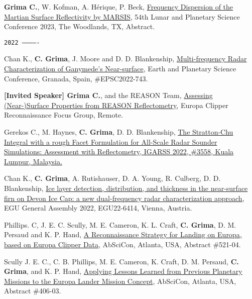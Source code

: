 \begin{etaremune}
\item
    \textbf{Grima C.}, W. Kofman, A. Hérique, P. Beck, \href{https://www.hou.usra.edu/meetings/lpsc2023/pdf/1120.pdf}{Frequency Dispersion of the Martian Surface Reflectivity by MARSIS}, 54th Lunar and Planetary Science Conference 2023, The Woodlands, TX, Abstract.

\hspace{-2em}\texttt{2022 -------------}

\item
  Chan K., \textbf{C. Grima}, J. Moore and D. D. Blankenship, \href{https://meetingorganizer.copernicus.org/EPSC2022/EPSC2022-743.html?pdf}{Multi-frequency Radar Characterization of Ganymede's Near-surface}, Earth and Planetary Science Conference, Granada, Spain, \#EPSC2022-743. 
\item
  \textbf{[Invited Speaker] Grima C.}, and the REASON Team, \href{}{Assessing (Near-)Surface Properties from REASON Reflectometry}, Europa Clipper Reconnaissance Focus Group, Remote.
\item
  Gerekos C., M. Haynes, \textbf{C. Grima}, D. D. Blankenship, \href{https://www.igarss2022.org/view_paper.php?PaperNum=3558}{The Stratton-Chu Integral with a rough Facet Formulation for All-Scale Radar Sounder Simulations: Assessment with Reflectometry, IGARSS 2022, \#3558, Kuala Lumpur, Malaysia.}
\item
  Chan K., \textbf{C. Grima}, A. Rutishauser, D. A. Young, R. Culberg, D. D. Blankenship, \href{https://meetingorganizer.copernicus.org/EGU22/EGU22-6414.html}{Ice layer detection, distribution, and thickness in the near-surface firn on Devon Ice Cap: a new dual-frequency radar characterization approach}, EGU General Assembly 2022, EGU22-6414, Vienna, Austria.
\item
  Phillips. C, J. E. C. Scully, M. E. Cameron, K. L. Craft, \textbf{C. Grima}, D. M. Persaud and K. P. Hand, \href{https://agu.confex.com/data/extendedabstract/agu/abscicon21/Paper_1028516_extendedabstract_91715_0.pdf}{A Reconnaissance Strategy for Landing on Europa, based on Europa Clipper Data}, AbSciCon, Atlanta, USA, Abstract \#521-04.
\item
  Scully J. E. C., C. B. Phillips, M. E. Cameron, K. Craft, D. M. Persaud, \textbf{C. Grima}, and K. P. Hand, \href{https://agu.confex.com/data/extendedabstract/agu/abscicon21/Paper_1029989_extendedabstract_90435_0.pdf}{Applying Lessons Learned from Previous Planetary Missions to the Europa Lander Mission Concept}, AbSciCon, Atlanta, USA, Abstract \#406-03.
\item

\end{etaremune}
